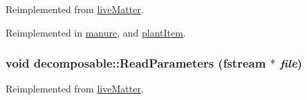 Reimplemented from \hyperlink{classlive_matter_a3b1eb79d0f248a4459874db44c335cac}{liveMatter}.

Reimplemented in \hyperlink{classmanure_aefa4f7856537616586ae73e8a34cdf97}{manure}, and \hyperlink{classplant_item_a8f1788f9c6299d63ad1fa4add42c0fe2}{plantItem}.\hypertarget{classdecomposable_a79e5c1092b6c8f3e9f233a26ed308c63}{
\subsubsection[{ReadParameters}]{\setlength{\rightskip}{0pt plus 5cm}void decomposable::ReadParameters (fstream $\ast$ {\em file})}}
\label{classdecomposable_a79e5c1092b6c8f3e9f233a26ed308c63}


Reimplemented from \hyperlink{classlive_matter_acaf1db5a1bb2fc9beb79002771f0282c}{liveMatter}.

